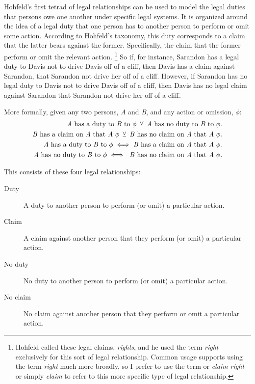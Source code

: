Hohfeld's first tetrad of legal relationships can be used to model the legal duties that persons owe one another under specific legal systems.
It is organized around the idea of a legal duty that one person has to another person to perform or omit some action.
According to Hohfeld's taxonomy, this duty corresponds to a claim that the latter bears against the former.
Specifically, the claim that the former perform or omit the relevant action.
\footnote{Hohfeld called these legal claims, \emph{rights}, and he used the term \emph{right} exclusively for this sort of legal relationship. Common usage supports using the term \emph{right} much more broadly, so I prefer to use the term or \emph{claim right} or simply \emph{claim} to refer to this more specific type of legal relationship.\label{fn:rightclaim}}
So if, for instance, Sarandon has a legal duty to Davis not to drive Davis off of a cliff, then Davis has a claim against Sarandon, that Sarandon not drive her off of a cliff. 
However, if Sarandon has no legal duty to Davis not to drive Davis off of a cliff,\footnotemark{} then Davis has no legal claim against Sarandon that Sarandon not drive her off of a cliff.


More formally, given any two persons, \emph{A} and \emph{B}, and any action or omission, $\phi$:
  \begin{align}
  \text{\emph{A} has a duty to \emph{B} to }\phi\: \veebar\: \text{\emph{A} has no duty to \emph{B} to }\phi.\\
  \text{\emph{B} has a claim on \emph{A} that \emph{A} }\phi{}\: \veebar\: \text{\emph{B} has no claim on \emph{A} that \emph{A} }\phi{}.\\
  \text{\emph{A} has a duty to \emph{B} to }\phi \iff \text{\emph{B} has a claim on \emph{A} that \emph{A} }\phi.\\
   \text{\emph{A} has no duty to \emph{B} to }\phi \iff \text{ \emph{B} has no claim on \emph{A} that \emph{A} }\phi.
   \end{align}

This consists of these four legal relationships:
\begin{description}
  \item[Duty] A duty to another person to perform (or omit) a particular action.
  \item[Claim] A claim against another person that they perform (or omit) a particular action.
  \item[No duty] No duty to another person to perform (or omit) a particular action.
  \item[No claim] No claim against another person that they perform or omit a particular action. 
\end{description}
   
